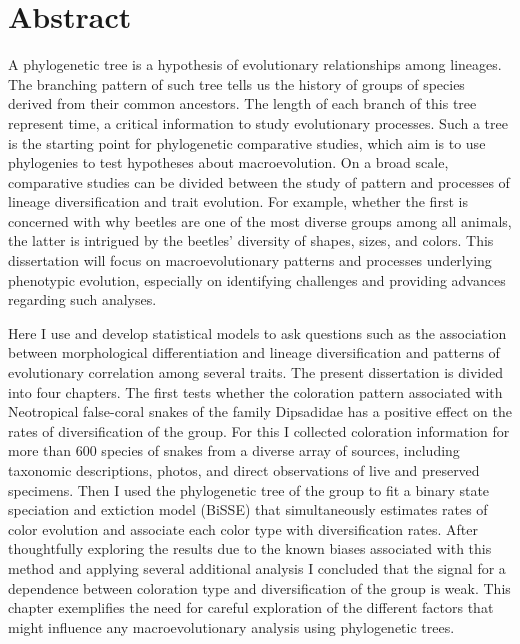 \section*{\large{Abstract}}

A phylogenetic tree is a hypothesis of evolutionary relationships among lineages. The branching pattern of such tree tells us the history of groups of species derived from their common ancestors. The length of each branch of this tree represent time, a critical information to study evolutionary processes. Such a tree is the starting point for phylogenetic comparative studies, which aim is to use phylogenies to test hypotheses about macroevolution. On a broad scale, comparative studies can be divided between the study of pattern and processes of lineage diversification and trait evolution. For example, whether the first is concerned with why beetles are one of the most diverse groups among all animals, the latter is intrigued by the beetles' diversity of shapes, sizes, and colors. This dissertation will focus on macroevolutionary patterns and processes underlying phenotypic evolution, especially on identifying challenges and providing advances regarding such analyses.

Here I use and develop statistical models to ask questions such as the association between morphological differentiation and lineage diversification and patterns of evolutionary correlation among several traits. The present dissertation is divided into four chapters. The first tests whether the coloration pattern associated with Neotropical false-coral snakes of the family Dipsadidae has a positive effect on the rates of diversification of the group. For this I collected coloration information for more than 600 species of snakes from a diverse array of sources, including taxonomic descriptions, photos, and direct observations of live and preserved specimens. Then I used the phylogenetic tree of the group to fit a binary state speciation and extiction model (BiSSE) that simultaneously estimates rates of color evolution and associate each color type with diversification rates. After thoughtfully exploring the results due to the known biases associated with this method and applying several additional analysis I concluded that the signal for a dependence between coloration type and diversification of the group is weak. This chapter exemplifies the need for careful exploration of the different factors that might influence any macroevolutionary analysis using phylogenetic trees.


